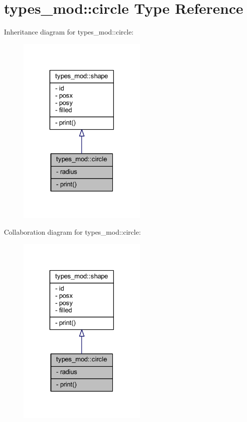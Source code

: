 \hypertarget{structtypes__mod_1_1circle}{}\section{types\+\_\+mod\+:\+:circle Type Reference}
\label{structtypes__mod_1_1circle}


Inheritance diagram for types\+\_\+mod\+:\+:circle\+:
\nopagebreak
\begin{figure}[H]
\begin{center}
\leavevmode
\includegraphics[width=177pt]{structtypes__mod_1_1circle__inherit__graph}
\end{center}
\end{figure}


Collaboration diagram for types\+\_\+mod\+:\+:circle\+:
\nopagebreak
\begin{figure}[H]
\begin{center}
\leavevmode
\includegraphics[width=177pt]{structtypes__mod_1_1circle__coll__graph}
\end{center}
\end{figure}
